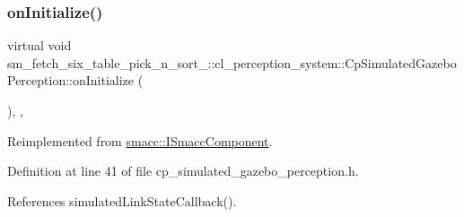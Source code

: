 \subsubsection{\texorpdfstring{on\+Initialize()}{onInitialize()}}
{\footnotesize\ttfamily virtual void sm\+\_\+fetch\+\_\+six\+\_\+table\+\_\+pick\+\_\+n\+\_\+sort\+\_\+::cl\+\_\+perception\+\_\+system\+::\+Cp\+Simulated\+Gazebo\+Perception\+::on\+Initialize (\begin{DoxyParamCaption}{ }\end{DoxyParamCaption})\hspace{0.3cm}{\ttfamily [inline]}, {\ttfamily [override]}, {\ttfamily [virtual]}}



Reimplemented from \hyperlink{classsmacc_1_1ISmaccComponent_ae6f71d008db12553912e9436184b9e65}{smacc\+::\+I\+Smacc\+Component}.



Definition at line 41 of file cp\+\_\+simulated\+\_\+gazebo\+\_\+perception.\+h.



References simulated\+Link\+State\+Callback().


